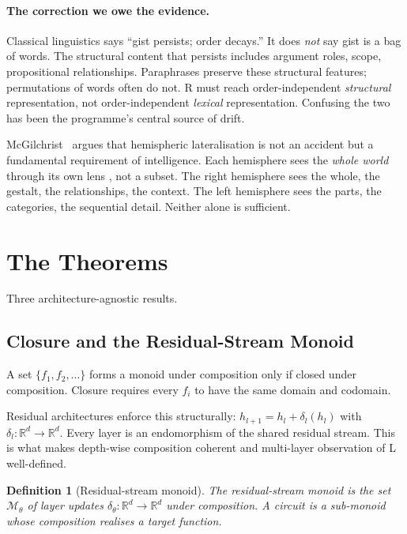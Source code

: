 \documentclass[10pt, twocolumn, a4paper]{article}
\newcommand{\R}{\mathbb{R}}
\newtheorem{definition}{Definition}
\begin{document}
\paragraph{The correction we owe the evidence.} Classical linguistics says ``gist persists; order decays.'' It does \emph{not} say gist is a bag of words. The structural content that persists includes argument roles, scope, propositional relationships. Paraphrases preserve these structural features; permutations of words often do not. R must reach order-independent \emph{structural} representation, not order-independent \emph{lexical} representation. Confusing the two has been the programme's central source of drift.

McGilchrist~\cite{mcgilchrist2009master, mcgilchrist2021matter} argues that hemispheric lateralisation is not an accident but a fundamental requirement of intelligence. Each hemisphere sees the \emph{whole world} through its own lens ,  not a subset. The right hemisphere sees the whole, the gestalt, the relationships, the context. The left hemisphere sees the parts, the categories, the sequential detail. Neither alone is sufficient.


\section{The Theorems}

Three architecture-agnostic results.

\subsection{Closure and the Residual-Stream Monoid}

A set $\{f_1, f_2, \ldots\}$ forms a monoid under composition only if closed under composition. Closure requires every $f_i$ to have the same domain and codomain.

Residual architectures enforce this structurally: $h_{l+1} = h_l + \delta_l(h_l)$ with $\delta_l: \R^d \to \R^d$. Every layer is an endomorphism of the shared residual stream. This is what makes depth-wise composition coherent and multi-layer observation of L well-defined.

\begin{definition}[Residual-stream monoid]
The residual-stream monoid is the set $\mathcal{M}_\theta$ of layer updates $\delta_\theta: \R^d \to \R^d$ under composition. A circuit is a sub-monoid whose composition realises a target function.
\end{definition}
\end{document}
